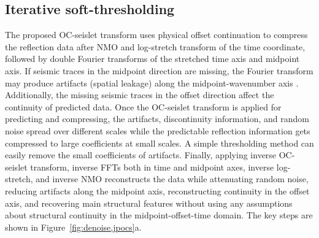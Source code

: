 
\subsection{Iterative soft-thresholding}

The proposed OC-seislet transform uses physical offset continuation to
compress the reflection data after NMO and log-stretch transform of
the time coordinate, followed by double Fourier transforms of the
stretched time axis and midpoint axis. If seismic traces in the
midpoint direction are missing, the Fourier transform may produce
artifacts (spatial leakage) along the midpoint-wavenumber axis
\cite[]{Zwartjes07}. Additionally, the missing seismic traces in
the offset direction affect the continuity of predicted data. Once
the OC-seislet transform is applied for predicting and compressing,
the artifacts, discontinuity information, and random noise spread over
different scales while the predictable reflection information gets
compressed to large coefficients at small scales. A simple
thresholding method can easily remove the small coefficients of
artifacts. Finally, applying inverse OC-seislet transform, inverse
FFTs both in time and midpoint axes, inverse log-stretch, and inverse
NMO reconstructs the data while attenuating random noise, reducing
artifacts along the midpoint axis, reconstructing continuity in the
offset axis, and recovering main structural features without using any
assumptions about structural continuity in the midpoint-offset-time
domain. The key steps are shown in Figure~\ref{fig:denoise,jpocs}a.

